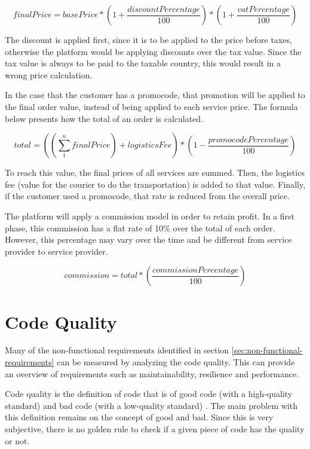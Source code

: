 \par

$$ finalPrice = basePrice * (1 + \frac{discountPercentage}{100}) * (1 + \frac{vatPercentage}{100})$$

\par

The discount is applied first, since it is to be applied to the price before taxes, otherwise the platform would be applying discounts over the tax value. Since the tax value is always to be paid to the taxable country, this would result in a wrong price calculation.

\par

In the case that the customer has a promocode, that promotion will be applied to the final order value, instead of being applied to each service price. The formula below presents how the total of an order is calculated.
\par
$$ total = ((\sum_{1}^{n} finalPrice) + logisticsFee) * (1 - \frac{promocodePercentage}{100})$$

\par
To reach this value, the final prices of all services are summed. Then, the logistics fee (value for the courier to do the transportation) is added to that value. Finally, if the customer used a promocode, that rate is reduced from the overall price.

\par

The platform will apply a commission model in order to retain profit. In a first phase, this commission has a flat rate of 10\% over the total of each order. However, this percentage may vary over the time and be different from service provider to service provider. 

$$ commission = total * ( \frac{commissionPercentage}{100})$$

\par

\section{Code Quality}
Many of the non-functional requirements identified in section \ref{sec:non-functional-requirements} can be measured by analyzing the code quality. This can provide an overview of requirements such as maintainability, resilience and performance.
\par
Code quality is the definition of code that is of good code (with a high-quality standard) and bad code (with a low-quality standard) \parencite{codeQuality}. The main problem with this definition remains on the concept of good and bad. Since this is very subjective, there is no golden rule to check if a given piece of code has the quality or not. 

